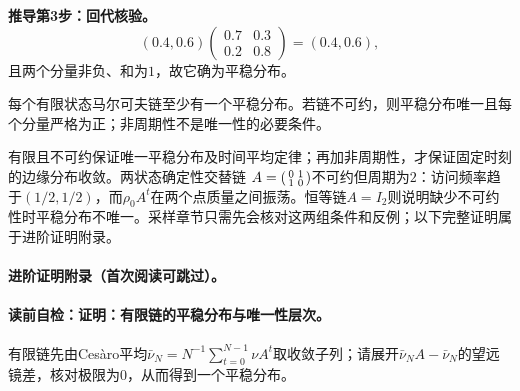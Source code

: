 \textbf{推导第3步：回代核验。}
\[
(0.4,0.6)
\begin{pmatrix}0.7&0.3\\0.2&0.8\end{pmatrix}
=(0.4,0.6),
\]
且两个分量非负、和为$1$，故它确为平稳分布。

\label{struct:V5-C01-CH12}
\begin{theorem}[有限链的平稳分布与唯一性层次]\label{thm:V5-C01-finite-stationary}
每个有限状态马尔可夫链至少有一个平稳分布。若链不可约，则平稳分布唯一且每个分量严格为正；非周期性不是唯一性的必要条件。
\end{theorem}
\begin{keypointbox}[title=先读结论、条件与反例]
有限且不可约保证唯一平稳分布及时间平均定律；再加非周期性，才保证固定时刻的边缘分布收敛。两状态确定性交替链
$A=\begin{psmallmatrix}0&1\\1&0\end{psmallmatrix}$不可约但周期为$2$：访问频率趋于$(1/2,1/2)$，而$\rho_0A^t$在两个点质量之间振荡。恒等链$A=I_2$则说明缺少不可约性时平稳分布不唯一。采样章节只需先会核对这两组条件和反例；以下完整证明属于进阶证明附录。
\end{keypointbox}
\paragraph{进阶证明附录（首次阅读可跳过）。}
\paragraph{读前自检：证明：有限链的平稳分布与唯一性层次。}有限链先由Cesàro平均$\bar\nu_N=N^{-1}\sum_{t=0}^{N-1}\nu A^t$取收敛子列；请展开$\bar\nu_NA-\bar\nu_N$的望远镜差，核对极限为0，从而得到一个平稳分布。\par

